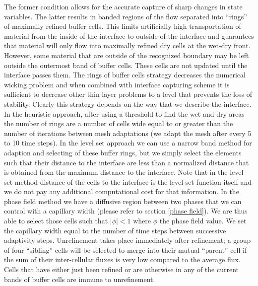 \documentclass[letterpaper,10pt]{article}
\begin{document}
The former condition allows for the accurate capture of sharp changes in state variables. The latter results in banded regions of the flow separated into ``rings'' of maximally refined buffer cells.  
This limits artificially high transportation of material from the inside of the interface to outside of the interface and guarantees that material will only flow into maximally refined dry 
cells at the wet-dry front.
However, some material that are outside of the recognized boundary may be left outside the outermost band of buffer cells. These cells are not updated until the interface passes them.
The rings of buffer cells strategy decreases the numerical wicking problem and when combined with interface capturing scheme it is sufficient to decrease other thin layer problems to a level that 
prevents the loss of stability.
Clearly this strategy depends on the way that we describe the interface. In the heuristic approach, after using a threshold to find the wet and dry areas the number of rings are a number of cells wide 
equal to or greater than the number of iterations between mesh adaptations (we adapt the mesh after every 5 to 10 time steps). In the level set approach we can use a narrow band method for adaption 
and selecting of these buffer rings, but we simply select the elements such that their distance to the interface are less than a normalized distance that is obtained from the maximum distance 
to the interface. Note that in the level set method distance of the cells to the interface is the level set function itself and we do not pay any additional computational cost for that information. 
In the phase field method we have a diffusive region between two phases that we can control with a capillary width (please refer to section \ref{phase field}).
We are thus able to select those cells such that $|\phi| <1 $ where $\phi$ the phase field value. We set the capillary width equal to the number of time steps between successive adaptivity steps.
Unrefinement takes place immediately after refinement; a group of four ``sibling'' cells will be selected to merge into their mutual ``parent'' cell if the sum of their inter-cellular fluxes is very 
low compared to the average flux.  Cells that have either just been refined or are otherwise in any of the current bands of buffer cells are immune 
to unrefinement.  
    
\end{document}
